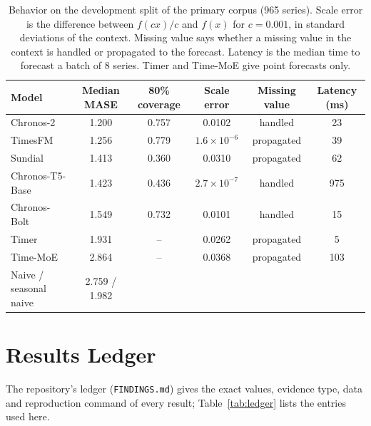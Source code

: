 \documentclass[twoside,11pt]{article}
\begin{document}
\begin{table}[!tb]
\centering
\small
\setlength{\tabcolsep}{4pt}
\begin{tabular}{@{}lccccc@{}}
\toprule
Model & Median MASE & 80\% coverage & Scale error & Missing value & Latency (ms) \\
\midrule
\textcolor{ctwo}{Chronos-2} & 1.200 & 0.757 & 0.0102 & handled & 23 \\
\textcolor{tfm}{TimesFM} & 1.256 & 0.779 & $1.6\times10^{-6}$ & propagated & 39 \\
\textcolor{sun}{Sundial} & 1.413 & 0.360 & 0.0310 & propagated & 62 \\
\textcolor{tt5}{Chronos-T5-Base} & 1.423 & 0.436 & $2.7\times10^{-7}$ & handled & 975 \\
\textcolor{bolt}{Chronos-Bolt} & 1.549 & 0.732 & 0.0101 & handled & 15 \\
\textcolor{timer}{Timer} & 1.931 & -- & 0.0262 & propagated & 5 \\
\textcolor{tmoe}{Time-MoE} & 2.864 & -- & 0.0368 & propagated & 103 \\
\midrule
Naive / seasonal naive & 2.759 / 1.982 & & & & \\
\bottomrule
\end{tabular}
\caption{Behavior on the development split of the primary corpus (965 series). Scale error is the difference between $f(cx)/c$ and $f(x)$ for $c=0.001$, in standard deviations of the context. Missing value says whether a missing value in the context is handled or propagated to the forecast. Latency is the median time to forecast a batch of 8 series. Timer and Time-MoE give point forecasts only.}
\label{tab:character}
\end{table}

\section{Results Ledger}
\label{app:ledger}

The repository's ledger (\texttt{FINDINGS.md}) gives the exact values, evidence type, data and reproduction command of every result; Table~\ref{tab:ledger} lists the entries used here.
\end{document}
